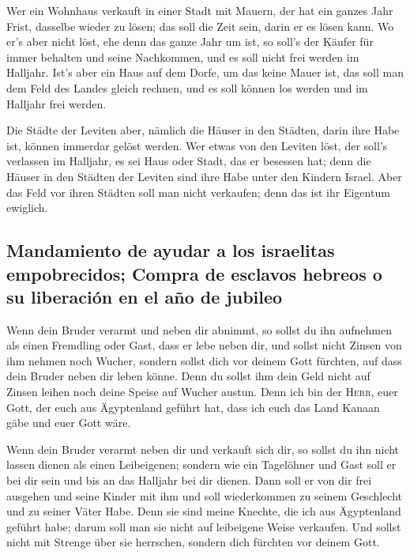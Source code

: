  Wer ein Wohnhaus verkauft in einer Stadt mit Mauern, der
hat ein ganzes Jahr Frist, dasselbe wieder zu lösen; das soll die Zeit
sein, darin er es lösen kann.  Wo er's aber nicht löst,
ehe denn das ganze Jahr um ist, so soll's der Käufer für immer behalten
und seine Nachkommen, und es soll nicht frei werden im Halljahr.
 Ist's aber ein Haus auf dem Dorfe, um das keine Mauer
ist, das soll man dem Feld des Landes gleich rechnen, und es soll können
los werden und im Halljahr frei werden.

 Die Städte der Leviten aber, nämlich die Häuser in den
Städten, darin ihre Habe ist, können immerdar gelöst werden.
 Wer etwas von den Leviten löst, der soll's verlassen im
Halljahr, es sei Haus oder Stadt, das er besessen hat; denn die Häuser
in den Städten der Leviten sind ihre Habe unter den Kindern Israel.
 Aber das Feld vor ihren Städten soll man nicht
verkaufen; denn das ist ihr Eigentum ewiglich.

\hypertarget{mandamiento-de-ayudar-a-los-israelitas-empobrecidos-compra-de-esclavos-hebreos-o-su-liberaciuxf3n-en-el-auxf1o-de-jubileo}{%
\subsection{Mandamiento de ayudar a los israelitas empobrecidos; Compra
de esclavos hebreos o su liberación en el año de
jubileo}\label{mandamiento-de-ayudar-a-los-israelitas-empobrecidos-compra-de-esclavos-hebreos-o-su-liberaciuxf3n-en-el-auxf1o-de-jubileo}}

 Wenn dein Bruder verarmt und neben dir abnimmt, so
sollst du ihn aufnehmen als einen Fremdling oder Gast, dass er lebe
neben dir,  und sollst nicht Zinsen von ihm nehmen noch
Wucher, sondern sollst dich vor deinem Gott fürchten, auf dass dein
Bruder neben dir leben könne.  Denn du sollst ihm dein
Geld nicht auf Zinsen leihen noch deine Speise auf Wucher austun.
 Denn ich bin der \textsc{Herr}, euer Gott, der euch aus
Ägyptenland geführt hat, dass ich euch das Land Kanaan gäbe und euer
Gott wäre.

 Wenn dein Bruder verarmt neben dir und verkauft sich
dir, so sollst du ihn nicht lassen dienen als einen Leibeigenen;
 sondern wie ein Tagelöhner und Gast soll er bei dir sein
und bis an das Halljahr bei dir dienen.  Dann soll er von
dir frei ausgehen und seine Kinder mit ihm und soll wiederkommen zu
seinem Geschlecht und zu seiner Väter Habe.  Denn sie
sind meine Knechte, die ich aus Ägyptenland geführt habe; darum soll man
sie nicht auf leibeigene Weise verkaufen.  Und sollst
nicht mit Strenge über sie herrschen, sondern dich fürchten vor deinem
Gott.

